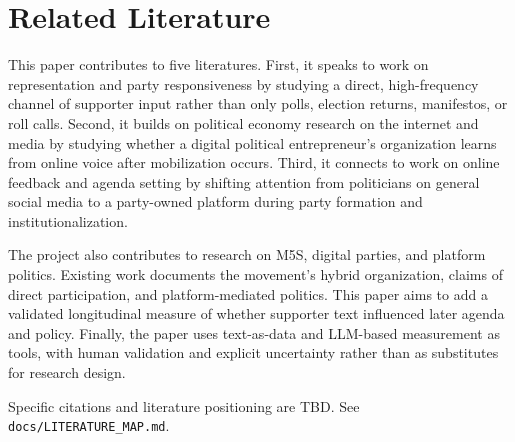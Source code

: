 \section{Related Literature}\label{sec:literature}

This paper contributes to five literatures. First, it speaks to work on representation and party responsiveness by studying a direct, high-frequency channel of supporter input rather than only polls, election returns, manifestos, or roll calls. Second, it builds on political economy research on the internet and media by studying whether a digital political entrepreneur's organization learns from online voice after mobilization occurs. Third, it connects to work on online feedback and agenda setting by shifting attention from politicians on general social media to a party-owned platform during party formation and institutionalization.

The project also contributes to research on M5S, digital parties, and platform politics. Existing work documents the movement's hybrid organization, claims of direct participation, and platform-mediated politics. This paper aims to add a validated longitudinal measure of whether supporter text influenced later agenda and policy. Finally, the paper uses text-as-data and LLM-based measurement as tools, with human validation and explicit uncertainty rather than as substitutes for research design.

Specific citations and literature positioning are TBD. See \texttt{docs/LITERATURE\_MAP.md}.
